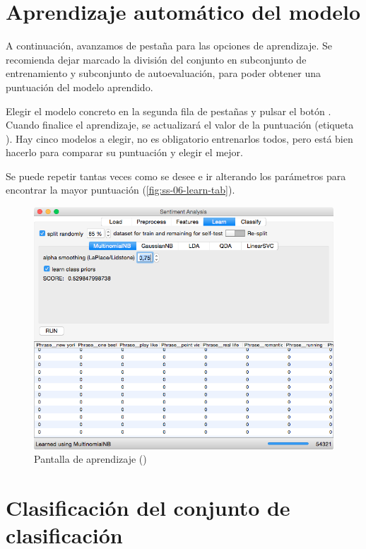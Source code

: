 \newpage
\section{Aprendizaje automático del modelo}
\label{sec:manual-learn}

A continuación, avanzamos de pestaña para las opciones de aprendizaje. Se recomienda dejar marcado la división del conjunto en subconjunto de entrenamiento y subconjunto de autoevaluación, para poder obtener una puntuación del modelo aprendido.

Elegir el modelo concreto en la segunda fila de pestañas y pulsar el botón . Cuando finalice el aprendizaje, se actualizará el valor de la puntuación (etiqueta ). Hay cinco modelos a elegir, no es obligatorio entrenarlos todos, pero está bien hacerlo para comparar su puntuación y elegir el mejor.

Se puede repetir tantas veces como se desee e ir alterando los parámetros para encontrar la mayor puntuación (\autoref{fig:ss-06-learn-tab}).

\begin{figure}[H]
\centering
\includegraphics[width=14cm]{ss-06-learn-tab}
\caption{Pantalla de aprendizaje ()}
\label{fig:ss-06-learn-tab}
\end{figure}

\newpage
\section{Clasificación del conjunto de clasificación}

